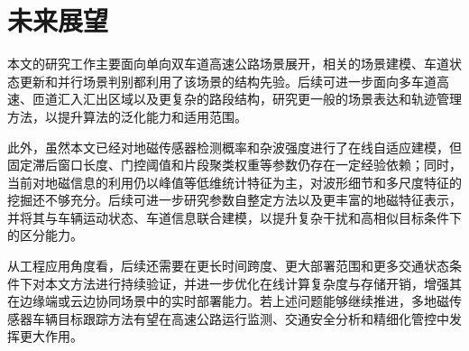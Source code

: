 \documentclass{xdupgthesis}
\begin{document}
\section{未来展望}

本文的研究工作主要面向单向双车道高速公路场景展开，相关的场景建模、车道状态更新和并行场景判别都利用了该场景的结构先验。后续可进一步面向多车道高速、匝道汇入汇出区域以及更复杂的路段结构，研究更一般的场景表达和轨迹管理方法，以提升算法的泛化能力和适用范围。

此外，虽然本文已经对地磁传感器检测概率和杂波强度进行了在线自适应建模，但固定滞后窗口长度、门控阈值和片段聚类权重等参数仍存在一定经验依赖；同时，当前对地磁信息的利用仍以峰值等低维统计特征为主，对波形细节和多尺度特征的挖掘还不够充分。后续可进一步研究参数自整定方法以及更丰富的地磁特征表示，并将其与车辆运动状态、车道信息联合建模，以提升复杂干扰和高相似目标条件下的区分能力。

从工程应用角度看，后续还需要在更长时间跨度、更大部署范围和更多交通状态条件下对本文方法进行持续验证，并进一步优化在线计算复杂度与存储开销，增强其在边缘端或云边协同场景中的实时部署能力。若上述问题能够继续推进，多地磁传感器车辆目标跟踪方法有望在高速公路运行监测、交通安全分析和精细化管控中发挥更大作用。
\end{document}
